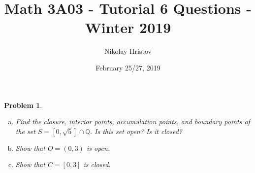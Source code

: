 \documentclass[11pt]{article}
\theoremstyle{plain}
\newtheorem{problem}{Problem}
\theoremstyle{remark}
\newcommand {\mbQ} {\mathbb Q}
\begin{document}
	\title{Math 3A03 - Tutorial 6 Questions - Winter 2019}
	\author{Nikolay Hristov}
	\date{February 25/27, 2019}
	\maketitle
	
	
	\begin{problem}
		
		\begin{enumerate} [(a)]
		\item Find the closure, interior points, accumulation points, and boundary points of the set $S=[0,\sqrt 5] \cap \mbQ$. Is this set open? Is it closed?
		
		\item Show that $O=(0,3)$ is open. 
		
		\item Show that $C=[0,3]$ is closed.
		
	\end{enumerate}
	\end{problem}
\end{document}

